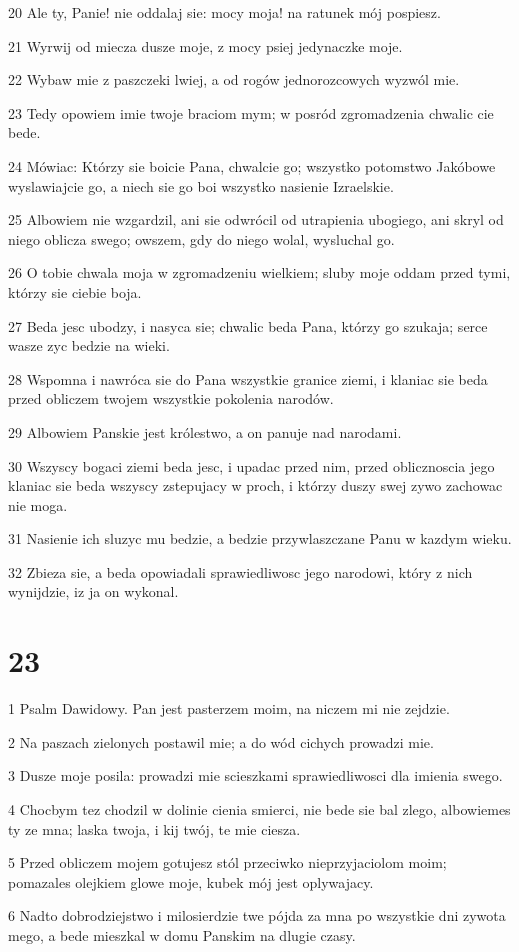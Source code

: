 \par 20 Ale ty, Panie! nie oddalaj sie: mocy moja! na ratunek mój pospiesz.
\par 21 Wyrwij od miecza dusze moje, z mocy psiej jedynaczke moje.
\par 22 Wybaw mie z paszczeki lwiej, a od rogów jednorozcowych wyzwól mie.
\par 23 Tedy opowiem imie twoje braciom mym; w posród zgromadzenia chwalic cie bede.
\par 24 Mówiac: Którzy sie boicie Pana, chwalcie go; wszystko potomstwo Jakóbowe wyslawiajcie go, a niech sie go boi wszystko nasienie Izraelskie.
\par 25 Albowiem nie wzgardzil, ani sie odwrócil od utrapienia ubogiego, ani skryl od niego oblicza swego; owszem, gdy do niego wolal, wysluchal go.
\par 26 O tobie chwala moja w zgromadzeniu wielkiem; sluby moje oddam przed tymi, którzy sie ciebie boja.
\par 27 Beda jesc ubodzy, i nasyca sie; chwalic beda Pana, którzy go szukaja; serce wasze zyc bedzie na wieki.
\par 28 Wspomna i nawróca sie do Pana wszystkie granice ziemi, i klaniac sie beda przed obliczem twojem wszystkie pokolenia narodów.
\par 29 Albowiem Panskie jest królestwo, a on panuje nad narodami.
\par 30 Wszyscy bogaci ziemi beda jesc, i upadac przed nim, przed oblicznoscia jego klaniac sie beda wszyscy zstepujacy w proch, i którzy duszy swej zywo zachowac nie moga.
\par 31 Nasienie ich sluzyc mu bedzie, a bedzie przywlaszczane Panu w kazdym wieku.
\par 32 Zbieza sie, a beda opowiadali sprawiedliwosc jego narodowi, który z nich wynijdzie, iz ja on wykonal.

\chapter{23}

\par 1 Psalm Dawidowy. Pan jest pasterzem moim, na niczem mi nie zejdzie.
\par 2 Na paszach zielonych postawil mie; a do wód cichych prowadzi mie.
\par 3 Dusze moje posila: prowadzi mie scieszkami sprawiedliwosci dla imienia swego.
\par 4 Chocbym tez chodzil w dolinie cienia smierci, nie bede sie bal zlego, albowiemes ty ze mna; laska twoja, i kij twój, te mie ciesza.
\par 5 Przed obliczem mojem gotujesz stól przeciwko nieprzyjaciolom moim; pomazales olejkiem glowe moje, kubek mój jest oplywajacy.
\par 6 Nadto dobrodziejstwo i milosierdzie twe pójda za mna po wszystkie dni zywota mego, a bede mieszkal w domu Panskim na dlugie czasy.


